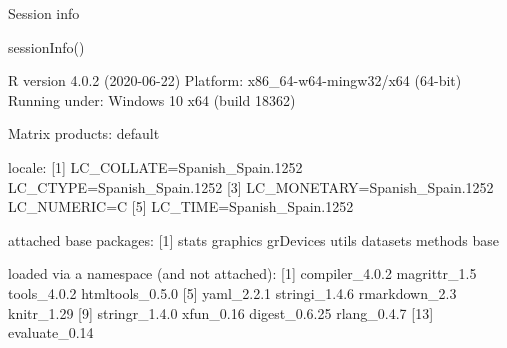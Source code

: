 \documentclass[
  ignorenonframetext,
]{beamer}
\newenvironment{Shaded}{\begin{snugshade}}{\end{snugshade}}
\newcommand{\FunctionTok}[1]{\textcolor[rgb]{0.00,0.00,0.00}{#1}}
\newcommand{\NormalTok}[1]{#1}
\let\oldShaded\Shaded
\let\endoldShaded\endShaded
\renewenvironment{Shaded}{\fontsize{10}{9}\oldShaded}{\endoldShaded}
\let\oldverbatim\verbatim
\let\endoldverbatim\endverbatim
\renewenvironment{verbatim}{\fontsize{6.5}{7.5}\selectfont\oldverbatim}{\endoldverbatim}
\begin{document}
\begin{frame}[fragile]{Session info}
\protect\hypertarget{session-info}{}
\begin{Shaded}
\begin{Highlighting}[]
\FunctionTok{sessionInfo}\NormalTok{()}
\end{Highlighting}
\end{Shaded}

\begin{verbatim}
R version 4.0.2 (2020-06-22)
Platform: x86_64-w64-mingw32/x64 (64-bit)
Running under: Windows 10 x64 (build 18362)

Matrix products: default

locale:
[1] LC_COLLATE=Spanish_Spain.1252  LC_CTYPE=Spanish_Spain.1252   
[3] LC_MONETARY=Spanish_Spain.1252 LC_NUMERIC=C                  
[5] LC_TIME=Spanish_Spain.1252    

attached base packages:
[1] stats     graphics  grDevices utils     datasets  methods   base     

loaded via a namespace (and not attached):
 [1] compiler_4.0.2  magrittr_1.5    tools_4.0.2     htmltools_0.5.0
 [5] yaml_2.2.1      stringi_1.4.6   rmarkdown_2.3   knitr_1.29     
 [9] stringr_1.4.0   xfun_0.16       digest_0.6.25   rlang_0.4.7    
[13] evaluate_0.14  
\end{verbatim}
\end{frame}
\end{document}
